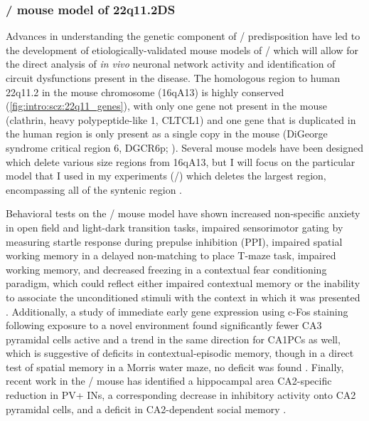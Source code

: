 \subsubsection{\df/ mouse model of \acs{22q11.2DS}}
\label{sec:intro:scz:df}
Advances in understanding the genetic component of \scz/ predisposition have led to the development of etiologically-validated mouse models of \scz/ which will allow for the direct analysis of \textit{in vivo} neuronal network activity and identification of circuit dysfunctions present in the disease.
The homologous region to human 22q11.2 in the mouse chromosome (16qA13) is highly conserved (\autoref{fig:intro:scz:22q11_genes}), with only one gene not present in the mouse (clathrin, heavy polypeptide-like 1, CLTCL1) and one gene that is duplicated in the human region is only present as a single copy in the mouse (DiGeorge syndrome critical region 6, DGCR6p; \citealp{Karayiorgou2010}).
Several mouse models have been designed which delete various size regions from 16qA13, but I will focus on the particular model that I used in my experiments (\df/) which deletes the largest region, encompassing all of the syntenic region \citep{Stark2008}.

Behavioral tests on the \df/ mouse model have shown increased non-specific anxiety in open field and light-dark transition tasks, impaired sensorimotor gating by measuring startle response during prepulse inhibition (PPI), impaired spatial working memory in a delayed non-matching to place T-maze task, impaired working memory, and decreased freezing in a contextual fear conditioning paradigm, which could reflect either impaired contextual memory or the inability to associate the unconditioned stimuli with the context in which it was presented \citep{Drew2011b, Stark2008, Sigurdsson2010}.
Additionally, a study of immediate early gene expression using c-Fos staining following exposure to a novel environment found significantly fewer CA3 pyramidal cells active and a trend in the same direction for \acp{CA1PC} as well, which is suggestive of deficits in contextual-episodic memory, though in a direct test of spatial memory in a Morris water maze, no deficit was found \citep{Drew2011b}.
Finally, recent work in the \df/ mouse has identified a hippocampal area CA2-specific reduction in \ac{PV}+ \acp{IN}, a corresponding decrease in inhibitory activity onto CA2 pyramidal cells, and a deficit in CA2-dependent social memory \citep{Piskorowski2016}.

